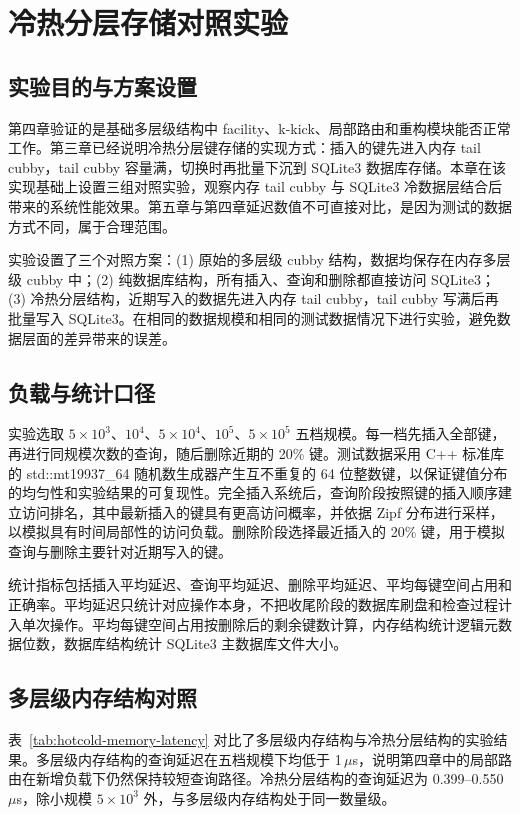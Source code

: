 \chapter{冷热分层存储对照实验}
\label{ch:hotcold}

\section{实验目的与方案设置}

第四章验证的是基础多层级结构中 facility、k-kick、局部路由和重构模块能否正常工作。第三章已经说明冷热分层键存储的实现方式：插入的键先进入内存 tail cubby，tail cubby 容量满，切换时再批量下沉到 SQLite3 数据库存储。本章在该实现基础上设置三组对照实验，观察内存 tail cubby 与 SQLite3 冷数据层结合后带来的系统性能效果。第五章与第四章延迟数值不可直接对比，是因为测试的数据方式不同，属于合理范围。

实验设置了三个对照方案：(1) 原始的多层级 cubby 结构，数据均保存在内存多层级 cubby 中；(2) 纯数据库结构，所有插入、查询和删除都直接访问 SQLite3；(3) 冷热分层结构，近期写入的数据先进入内存 tail cubby，tail cubby 写满后再批量写入 SQLite3。在相同的数据规模和相同的测试数据情况下进行实验，避免数据层面的差异带来的误差。

\section{负载与统计口径}

实验选取 \(5\times10^3\)、\(10^4\)、\(5\times10^4\)、\(10^5\)、\(5\times10^5\) 五档规模。每一档先插入全部键，再进行同规模次数的查询，随后删除近期的 20\% 键。测试数据采用 C++ 标准库的 std::mt19937\_64 随机数生成器产生互不重复的 64 位整数键，以保证键值分布的均匀性和实验结果的可复现性。完全插入系统后，查询阶段按照键的插入顺序建立访问排名，其中最新插入的键具有更高访问概率，并依据 Zipf 分布进行采样，以模拟具有时间局部性的访问负载\cite{cooper2010ycsb}。删除阶段选择最近插入的 20\% 键，用于模拟查询与删除主要针对近期写入的键。

统计指标包括插入平均延迟、查询平均延迟、删除平均延迟、平均每键空间占用和正确率。平均延迟只统计对应操作本身，不把收尾阶段的数据库刷盘和检查过程计入单次操作。平均每键空间占用按删除后的剩余键数计算，内存结构统计逻辑元数据位数，数据库结构统计 SQLite3 主数据库文件大小。

\section{多层级内存结构对照}

表~\ref{tab:hotcold-memory-latency} 对比了多层级内存结构与冷热分层结构的实验结果。多层级内存结构的查询延迟在五档规模下均低于 1\,$\mu$s，说明第四章中的局部路由在新增负载下仍然保持较短查询路径。冷热分层结构的查询延迟为 0.399--0.550\,$\mu$s，除小规模 \(5\times10^3\) 外，与多层级内存结构处于同一数量级。

